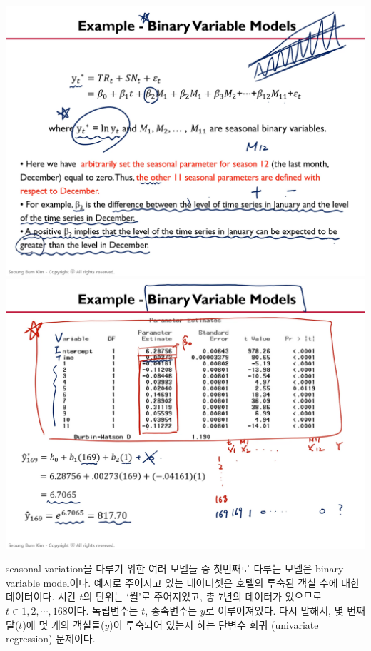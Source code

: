 \documentclass{article}
\begin{document}
\begin{center}
\includegraphics[width=.45\textwidth]{model_1-6}
\includegraphics[width=.45\textwidth]{model_1-7}
\end{center}

seasonal variation을 다루기 위한 여러 모델들 중 첫번째로 다루는 모델은 binary variable model이다.
예시로 주어지고 있는 데이터셋은 호텔의 투숙된 객실 수에 대한 데이터이다.
시간 \(t\)의 단위는 `월'로 주어져있고, 총 7년의 데이터가 있으므로 \(t\in 1, 2,\cdots,168\)이다.
독립변수는 \(t\), 종속변수는 \(y\)로 이루어져있다.
다시 말해서, 몇 번째 달(\(t\))에 몇 개의 객실들(\(y\))이 투숙되어 있는지 하는 단변수 회귀 (univariate regression) 문제이다.
\end{document}
